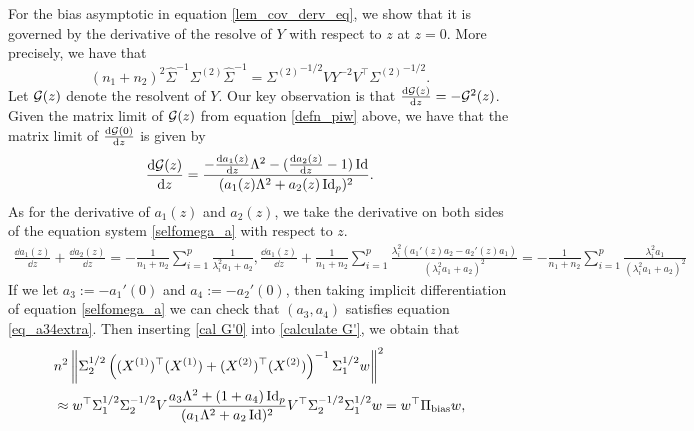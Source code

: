 For the bias asymptotic in equation \eqref{lem_cov_derv_eq}, we show that it is governed by the derivative of the resolve of $Y$ with respect to $z$ at $z = 0$.
More precisely, we have that
	\[ (n_1 + n_2)^2 \hat{\Sigma}^{-1}\Sigma^{(2)}\hat{\Sigma}^{-1} = {\Sigma^{(2)}}^{-1/2} V Y^{-2} V^{\top} {\Sigma^{(2)}}^{-1/2}. \]
Let $\cal G(z)$ denote the resolvent of $Y$.
Our key observation is that $\frac{\dd{\cal G(z)}}{\dd z} = - \cal G^2(z)$.
Given the matrix limit of $\cal G(z)$ from equation \eqref{defn_piw} above, we have that the matrix limit of $\frac{\dd{\cal G(0)}}{\dd z}$ is given by
\begin{align}\label{cal G'0}
	\frac{\dd \cal G(z)}{\dd z} = \frac{-\frac{\dd a_1(z)}{\dd z}\Lambda^2 - (\frac{\dd a_2(z)}{\dd z} - 1)\id}{(a_{1}(z)\Lambda^2 + a_{2}(z)\id_p)^2}.
\end{align}
As for the derivative of $a_1(z)$ and $a_2(z)$, we take the derivative on both sides of the equation system \eqref{selfomega_a} with respect to $z$.
\begin{align*}
	\frac{\dd a_1(z)}{\dd z} + \frac{\dd a_2(z)}{\dd z} = -\frac{1}{n_1 + n_2} \sum_{i=1}^p \frac{1}{\lambda_i^2 a_1 + a_2},
	\frac{\dd a_1(z)}{\dd z} + \frac{1}{n_1 + n_2}\sum_{i=1}^p \frac{\lambda_i^2 (a_1'(z) a_2 - a_2'(z) a_1)}{(\lambda_i^2 a_1 + a_2)^2} = -\frac{1}{n_1 + n_2} \sum_{i=1}^p \frac{\lambda_i^2 a_1}{(\lambda_i^2 a_1 + a_2)^2}
\end{align*}
If we let $a_3:=-a_1'(0)$ and $a_4:=-a_2'(0)$, then taking implicit differentiation of equation \eqref{selfomega_a} we can check that $(a_3,a_4)$ satisfies equation \eqref{eq_a34extra}. Then inserting \eqref{cal G'0} into \eqref{calculate G'}, we obtain that
\begin{align}
& n^2\bignorm{\Sigma_2^{1/2} \bigbrace{ (X^{(1)})^{\top}(X^{(1)}) + (X^{(2)})^{\top}(X^{(2)}) }^{-1} \Sigma_1^{1/2} w}^2 \nonumber\\
&\approx  w^\top \Sigma_1^{1/2}\Sigma_2^{-1/2}V\frac{a_3\Lambda^2 +(1+ a_4)\id_p}{(a_{1}\Lambda^2 + a_{2}\id)^2}V^\top \Sigma_2^{-1/2}\Sigma_1^{1/2}w= w^{\top} \Pi_\bias w, \label{calculatePibias}
\end{align}
